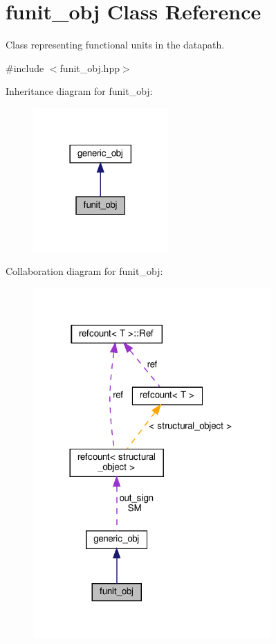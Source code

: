 \hypertarget{classfunit__obj}{}\section{funit\+\_\+obj Class Reference}
\label{classfunit__obj}


Class representing functional units in the datapath.  




{\ttfamily \#include $<$funit\+\_\+obj.\+hpp$>$}



Inheritance diagram for funit\+\_\+obj\+:
\nopagebreak
\begin{figure}[H]
\begin{center}
\leavevmode
\includegraphics[width=146pt]{dc/d23/classfunit__obj__inherit__graph}
\end{center}
\end{figure}


Collaboration diagram for funit\+\_\+obj\+:
\nopagebreak
\begin{figure}[H]
\begin{center}
\leavevmode
\includegraphics[width=257pt]{d3/da2/classfunit__obj__coll__graph}
\end{center}
\end{figure}
